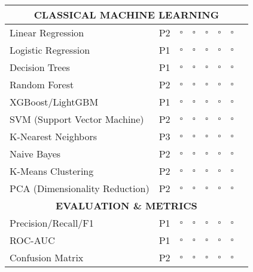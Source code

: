 \documentclass[10pt]{article}
\begin{document}
\begin{center}
\begin{longtable}{|p{3.5cm}|c|c|c|c|c|c|p{3cm}|}
\multicolumn{8}{|c|}{\cellcolor{gray!30}\textbf{CLASSICAL MACHINE LEARNING}} \\
\hline

Linear Regression & P2 & $\square$ & $\square$ & $\square$ & $\square$ & $\square$ & \\
\hline

Logistic Regression & P1 & $\square$ & $\square$ & $\square$ & $\square$ & $\square$ & \\
\hline

Decision Trees & P1 & $\square$ & $\square$ & $\square$ & $\square$ & $\square$ & \\
\hline

Random Forest & P2 & $\square$ & $\square$ & $\square$ & $\square$ & $\square$ & \\
\hline

XGBoost/LightGBM & P1 & $\square$ & $\square$ & $\square$ & $\square$ & $\square$ & \\
\hline

SVM (Support Vector Machine) & P2 & $\square$ & $\square$ & $\square$ & $\square$ & $\square$ & \\
\hline

K-Nearest Neighbors & P3 & $\square$ & $\square$ & $\square$ & $\square$ & $\square$ & \\
\hline

Naive Bayes & P2 & $\square$ & $\square$ & $\square$ & $\square$ & $\square$ & \\
\hline

K-Means Clustering & P2 & $\square$ & $\square$ & $\square$ & $\square$ & $\square$ & \\
\hline

PCA (Dimensionality Reduction) & P2 & $\square$ & $\square$ & $\square$ & $\square$ & $\square$ & \\
\hline

\multicolumn{8}{|c|}{\cellcolor{gray!30}\textbf{EVALUATION \& METRICS}} \\
\hline

Precision/Recall/F1 & P1 & $\square$ & $\square$ & $\square$ & $\square$ & $\square$ & \\
\hline

ROC-AUC & P1 & $\square$ & $\square$ & $\square$ & $\square$ & $\square$ & \\
\hline

Confusion Matrix & P2 & $\square$ & $\square$ & $\square$ & $\square$ & $\square$ & \\
\hline


\end{longtable}
\end{center}
\end{document}
